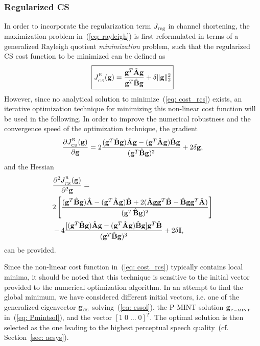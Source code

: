 \documentclass[draftcls,onecolumn,11pt]{IEEEtran}
\begin{document}
\subsubsection*{Regularized CS}
In order to incorporate the regularization term $J_{\rm reg}$ in channel shortening, the maximization problem in~(\ref{eq: rayleigh}) is first reformulated in terms of a generalized Rayleigh quotient \emph{minimization} problem, such that the regularized CS cost function to be minimized can be defined as
\begin{equation}
\label{eq: cost_rcs}
\boxed{J_{{}_{\rm CS}}^{^{_{\rm R}}}(\mathbf{g})= \frac{\mathbf{g}^T {\hat{\mathbf{A}}} \mathbf{g}}{\mathbf{g}^T {\hat{\mathbf{B}}} \mathbf{g}} + \delta \|\mathbf{g} \|_2^2}
\end{equation}
However, since no analytical solution to minimize~(\ref{eq: cost_rcs}) exists, an iterative optimization technique for minimizing this non-linear cost function will be used in the following.
In order to improve the numerical robustness and the convergence speed of the optimization technique, the gradient
\begin{equation}
\frac{\partial J_{{}_{\rm CS}}^{^{_{\rm R}}}(\mathbf{g})}{\partial \mathbf{g}} = 2 \frac{(\mathbf{g}^T \hat{\mathbf{B}} \mathbf{g})\hat{\mathbf{A}}\mathbf{g} - (\mathbf{g}^T \hat{\mathbf{A}} \mathbf{g})\hat{\mathbf{B}}\mathbf{g} }{(\mathbf{g}^T \hat{\mathbf{B}} \mathbf{g})^2} + 2 \delta \mathbf{g},
\end{equation}
and the Hessian
\begin{equation}
\begin{split}
& \frac{\partial ^2 J_{{}_{\rm CS}}^{^{_{\rm R}}}(\mathbf{g})}{\partial^2 \mathbf{g}}  = \\
& 2 \left[ \frac{(\mathbf{g}^T \hat{\mathbf{B}} \mathbf{g}) \hat{\mathbf{A}} - (\mathbf{g}^T \hat{\mathbf{A}} \mathbf{g}) \hat{\mathbf{B}} + 2 ( \hat{\mathbf{A}} \mathbf{g} \mathbf{g}^T \hat{\mathbf{B}} - \hat{\mathbf{B}} \mathbf{g} \mathbf{g}^T \hat{\mathbf{A}})}{(\mathbf{g}^T \hat{\mathbf{B}}\mathbf{g})^2} \right] \\
& -  4 \frac{[(\mathbf{g}^T\hat{\mathbf{B}}\mathbf{g})\hat{\mathbf{A}}\mathbf{g} - (\mathbf{g}^T\hat{\mathbf{A}}\mathbf{g})\hat{\mathbf{B}}\mathbf{g}] \mathbf{g}^T \hat{\mathbf{B}}}{(\mathbf{g}^T\hat{\mathbf{B}}\mathbf{g})^3} + 2 \delta \mathbf{I},
\end{split}
\end{equation}
can be provided.

Since the non-linear cost function in~(\ref{eq: cost_rcs}) typically contains local minima, it should be noted that this technique is sensitive to the initial vector provided to the numerical optimization algorithm.
In an attempt to find the global minimum, we have considered different initial vectors, i.e. one of the generalized eigenvector $\mathbf{g}_{_{\rm CS}}$ solving~(\ref{eq: cssol}), the P-MINT solution $\mathbf{g}_{{}_{\rm P-MINT}}$ in~(\ref{eq: Pmintsol}), and the vector $[1 \; 0 \; \ldots \; 0]^T$.
The optimal solution is then selected as the one leading to the highest perceptual speech quality~(cf. Section~\ref{sec: acsys}).
\end{document}
